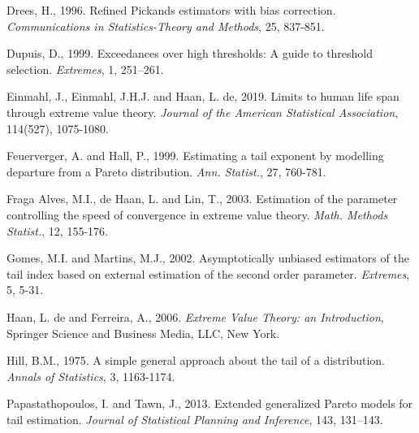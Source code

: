 \documentclass[twoside,leqno,11pt]{article}
\begin{document}
\begin{thebibliography}{99}
Drees, H., 1996. Refined Pickands estimators with bias correction. {\it Communications in Statistics-Theory and Methods}, 25, 837-851.
 
 Dupuis, D., 1999. Exceedances over  high thresholds: A guide to threshold selection. {\it Extremes}, 1, 251--261.
 
 Einmahl, J., Einmahl, J.H.J. and Haan, L. de, 2019. Limits to human life span through extreme value theory. {\it Journal of the American Statistical Association}, 114(527), 1075-1080.
 
Feuerverger, A. and Hall, P., 1999. Estimating a tail exponent by modelling departure from a Pareto distribution. {\it Ann. Statist.}, 27, 760-781.  
 
  

Fraga Alves, M.I., de Haan, L. and Lin, T., 2003. Estimation of the parameter controlling the speed of convergence in extreme value theory. {\it Math. Methods Statist.}, 12, 155-176.

  
  Gomes, M.I. and Martins, M.J., 2002. Asymptotically unbiased estimators of the tail index based on external estimation of the second order parameter. {\it Extremes}, 5, 5-31.
  
Haan, L. de and Ferreira, A., 2006. {\it Extreme Value Theory: an Introduction}, Springer Science and Business Media, LLC, New York.  
  
 Hill, B.M., 1975. A simple general approach about the tail of a distribution. {\it Annals of Statistics}, 3, 1163-1174.
 


Papastathopoulos, I. and Tawn, J., 2013. Extended generalized Pareto models for tail estimation. {\it Journal of Statistical Planning and Inference}, 143, 131--143.


\end{thebibliography}
\end{document}
